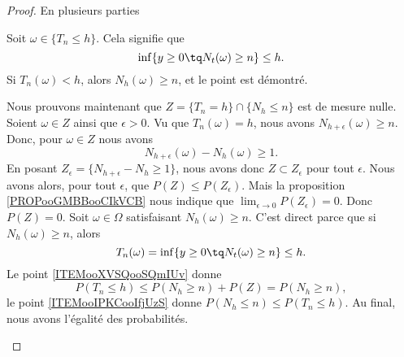 \begin{proof}
    En plusieurs parties
    \begin{subproof}
        Soit \( \omega\in\{ T_n\leq h \}\). Cela signifie que 
        \begin{equation}
            \inf\{ y\geq 0\tq N_t(\omega)\geq n \}\leq h.
        \end{equation}
        Si \( T_n(\omega)<h\), alors \( N_h(\omega)\geq n\), et le point est démontré.

        Nous prouvons maintenant que \(  Z=\{ T_n=h \}\cap \{ N_h\leq n \}\) est de mesure nulle. Soient \( \omega\in Z\) ainsi que \( \epsilon>0\). Vu que \( T_n(\omega)=h\), nous avons \( N_{h+\epsilon}(\omega)\geq n\). Donc, pour \( \omega\in Z\) nous avons
        \begin{equation}
            N_{h+\epsilon}(\omega)-N_h(\omega)\geq 1.
        \end{equation}
        En posant \( Z_{\epsilon}=\{ N_{h+\epsilon}-N_h\geq 1 \}\), nous avons donc \( Z\subset Z_{\epsilon}\) pour tout \( \epsilon\). Nous avons alors, pour tout \( \epsilon\), que \( P(Z)\leq P(Z_{\epsilon})\). Mais la proposition \ref{PROPooGMBBooCIkVCB} nous indique que \( \lim_{\epsilon\to 0}P(Z_{\epsilon})=0\). Donc \( P(Z)=0\).
        Soit \( \omega\in \Omega\) satisfaisant \( N_h(\omega)\geq n\). C'est direct parce que si \( N_h(\omega)\geq n\), alors
        \begin{equation}
            T_n(\omega)=\inf\{ y\geq 0\tq N_t(\omega)\geq n \}\leq h.
        \end{equation}
        Le point \ref{ITEMooXVSQooSQmIUv} donne 
        \begin{equation}
            P(T_n\leq h)\leq P(N_h\geq n)+P(Z)=P(N_h\geq n),
        \end{equation}
        le point \ref{ITEMooIPKCooIfjUzS} donne \( P(N_h\leq n)\leq P(T_n\leq h)\). Au final, nous avons l'égalité des probabilités.
    \end{subproof}
\end{proof}

